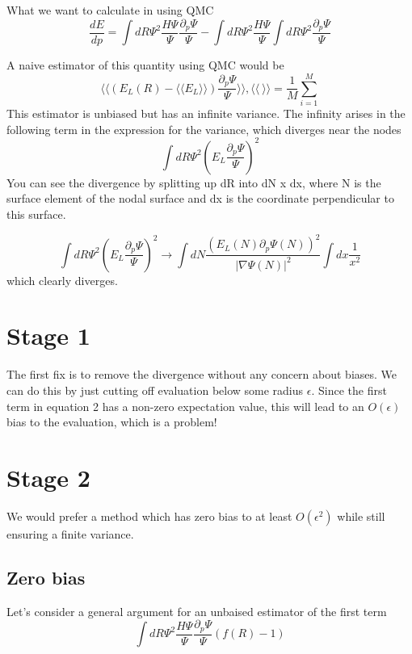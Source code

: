 \documentclass{article}
\begin{document}
What we want to calculate in using QMC
\begin{equation}
\frac{dE}{dp} = \int dR \Psi^2 \frac{H\Psi}{\Psi} \frac{\partial_p \Psi}{\Psi}  - \int dR \Psi^2 \frac{H\Psi}{\Psi} \int dR \Psi^2 \frac{\partial_p \Psi}{\Psi}
\end{equation}

A naive estimator of this quantity using QMC would be 
\begin{equation}
\langle \langle (E_L(R) - \langle \langle E_L \rangle \rangle) \frac{\partial_p\Psi}{\Psi} \rangle \rangle, \langle \langle \ \rangle \rangle = \frac{1}{M} \sum_{i=1}^M
\end{equation}
This estimator is unbiased but has an infinite variance. The infinity arises in the following term in the expression for the variance, which diverges near the nodes
$$ 
\int dR \Psi^2 (E_L \frac{\partial_p \Psi}{\Psi})^2 
$$
You can see the divergence by splitting up dR into dN x dx, where N is the surface element of the nodal surface and dx is the coordinate perpendicular to this surface.

\begin{equation}
\int dR \Psi^2 (E_L \frac{\partial_p \Psi}{\Psi})^2 \rightarrow \int dN \frac{(E_L(N) \partial_p \Psi(N))^2}{|\nabla\Psi(N)|^2} \int dx \frac{1}{x^2} 
\end{equation}
which clearly diverges.

\section{Stage 1}
The first fix is to remove the divergence without any concern about biases. We can do this by just cutting off evaluation below some radius $\epsilon$.
Since the first term in equation 2 has a non-zero expectation value, this will lead to an $O(\epsilon)$ bias to the evaluation, which is a problem!

\section{Stage 2}
We would prefer a method which has zero bias to at least $O(\epsilon^2)$ while still ensuring a finite variance.

\subsection{Zero bias}
Let's consider a general argument for an unbaised estimator of the first term
\begin{equation}
\int dR \Psi^2 \frac{H\Psi}{\Psi} \frac{\partial_p\Psi}{\Psi} (f(R) - 1)
\end{equation}
\end{document}
